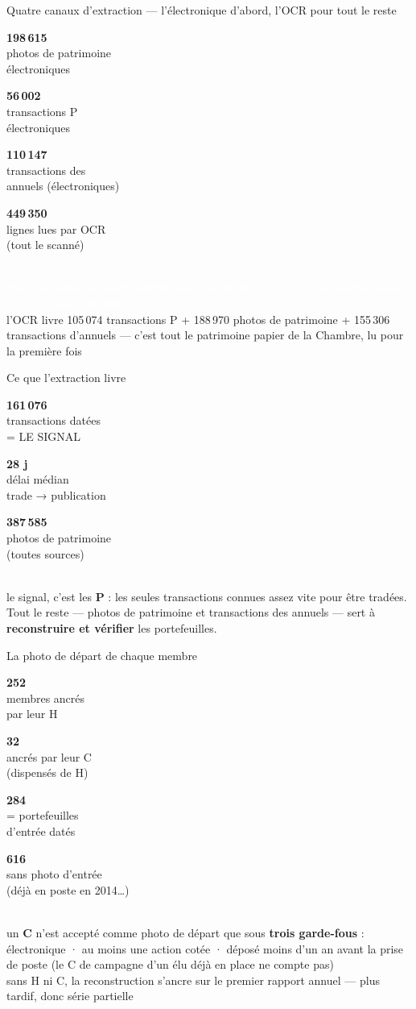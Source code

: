 \documentclass[11pt,aspectratio=169]{beamer}
\newcommand{\tuile}[3]{%
  \begin{minipage}[t]{0.23\textwidth}\centering
    \colorbox{#1}{\parbox[c][21mm][c]{\dimexpr\linewidth-8pt}{\centering
      {\color{white}\Large\textbf{#2}}\\[0.6mm]
      {\color{white}\footnotesize #3}}}
  \end{minipage}}
\newcommand{\badge}[2]{\colorbox{#1}{\textcolor{white}{\footnotesize\textbf{#2}}}}
\begin{document}
\begin{frame}{Quatre canaux d'extraction — l'électronique d'abord, l'OCR pour tout le reste}
  \centering
  \tuile{dataC}{198\,615}{photos de patrimoine\\électroniques}\hfill
  \tuile{helec}{56\,002}{transactions P\\électroniques}\hfill
  \tuile{helec}{110\,147}{transactions des\\annuels (électroniques)}\hfill
  \tuile{hocr}{449\,350}{lignes lues par OCR\\(tout le scanné)}\\[4mm]
  {\footnotesize \badge{okgreen}{rien de lisible ne part inutilement en OCR — et zéro
   document scanné n'a été laissé de côté}}\\[2.5mm]
  {\scriptsize\color{black!60} l'OCR livre 105\,074 transactions P + 188\,970 photos de
   patrimoine + 155\,306 transactions d'annuels — c'est tout le patrimoine papier de la
   Chambre, lu pour la première fois}
\end{frame}

\begin{frame}{Ce que l'extraction livre}
  \centering
  \tuile{okgreen}{161\,076}{transactions datées\\= LE SIGNAL}\hfill
  \tuile{helec}{28 j}{délai médian\\trade → publication}\hfill
  \tuile{dataC}{387\,585}{photos de patrimoine\\(toutes sources)}\\[4mm]
  {\footnotesize le signal, c'est les \textbf{P} : les seules transactions connues assez vite
   pour être tradées. Tout le reste — photos de patrimoine et transactions des annuels —
   sert à \textbf{reconstruire et vérifier} les portefeuilles.}
\end{frame}

\begin{frame}{La photo de départ de chaque membre}
  \centering
  \tuile{okgreen}{252}{membres ancrés\\par leur H}\hfill
  \tuile{dataC}{32}{ancrés par leur C\\(dispensés de H)}\hfill
  \tuile{helec}{284}{= portefeuilles\\d'entrée datés}\hfill
  \tuile{grisC}{616}{sans photo d'entrée\\(déjà en poste en 2014…)}\\[4mm]
  {\footnotesize un \textbf{C} n'est accepté comme photo de départ que sous
   \textbf{trois garde-fous} : électronique · au moins une action cotée · déposé moins
   d'un an avant la prise de poste (le C de campagne d'un élu déjà en place ne compte pas)}\\[2mm]
  {\scriptsize\color{black!60} sans H ni C, la reconstruction s'ancre sur le premier
   rapport annuel — plus tardif, donc série partielle}
\end{frame}
\end{document}
